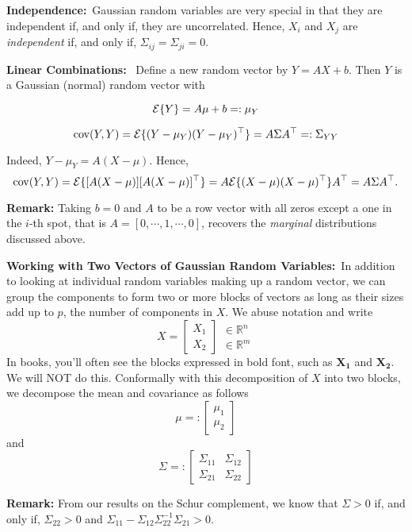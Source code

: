 \documentclass[letterpaper]{article}
\newcommand{\real}{\mathbb R}  %
\newcommand{\cov}{\mathrm{cov}}
\begin{document}
\noindent \textbf{Independence:}~Gaussian random variables are very special in that they are independent if, and only if, they are uncorrelated. Hence, $X_i$ and $X_j$ are \textit{independent} if, and only if, $\Sigma_{ij} = \Sigma_{ji}=0$.


\noindent \textbf{Linear Combinations:}~ Define a new random vector by $Y=A X + b$. Then $Y$ is a Gaussian (normal) random vector with

$${\cal E} \{ Y\} = A \mu + b=:\mu_Y$$

$$\cov(Y,Y)={\cal E} \{ (Y-\mu_Y) (Y-\mu_Y)^\top \} =A \Sigma A^\top =: \Sigma_{YY}$$

Indeed, $Y-\mu_Y = A(X-\mu)$. Hence,
$$\cov(Y,Y)={\cal E} \{ [A(X-\mu)] [A(X-\mu)]^\top \} =A {\cal E} \{ (X-\mu) (X-\mu)^\top \}A^\top=A \Sigma A^\top.$$

\noindent \textbf{Remark:} Taking $b=0$ and $A$ to be a row vector with all zeros except a one in the $i$-th spot, that is $A=[0, \cdots, 1, \cdots, 0]$, recovers the \textit{marginal} distributions discussed above.

\noindent \textbf{Working with Two Vectors of Gaussian Random Variables:}~In addition to looking at individual random variables making up a random vector, we can group the components to form two or more blocks of vectors as long as their sizes add up to $p$, the number of components in $X$. We abuse notation and write
$$X = \begin{bmatrix} X_1 \\ X_2 \end{bmatrix} \begin{array}{c} \in \real^{n} \\ \in \real^{m} \end{array}$$
In books, you'll often see the blocks expressed in bold font, such as $\mathbf{X_1}$ and $\mathbf{X_2}$. We will NOT do this. Conformally with this decomposition of $X$ into two blocks, we decompose the mean and covariance as follows
$$ \mu =: \begin{bmatrix} \mu_1 \\ \mu_2 \end{bmatrix} $$
and
$$ \Sigma =: \left[ \begin{array}{cc} \Sigma_{11} & \Sigma_{12} \\ \Sigma_{21} & \Sigma_{22} \end{array}  \right]$$

\noindent \textbf{Remark:} From our results on the Schur complement, we know that $\Sigma>0$ if, and only if, $\Sigma_{22}>0$ and $ \Sigma_{11}-\Sigma_{12} \Sigma_{22}^{-1}\Sigma_{21}>0$.
\end{document}
